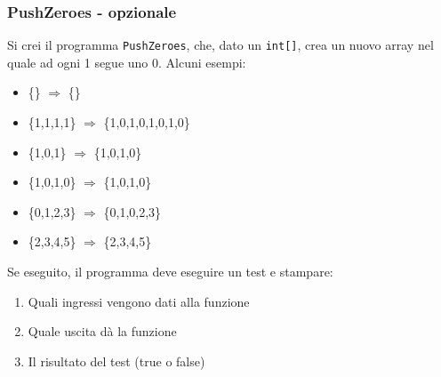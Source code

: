 \documentclass{beamer}
\begin{document}
\begin{frame}
\frametitle{PushZeroes - opzionale}
Si crei il programma \texttt{PushZeroes}, che, dato un \texttt{int[]}, crea un nuovo array nel quale ad ogni 1 segue uno 0. Alcuni esempi:
\begin{itemize}
 \item \{\} $\Rightarrow$ \{\}
 \item \{1,1,1,1\} $\Rightarrow$ \{1,0,1,0,1,0,1,0\}
 \item \{1,0,1\} $\Rightarrow$ \{1,0,1,0\}
 \item \{1,0,1,0\} $\Rightarrow$ \{1,0,1,0\}
 \item \{0,1,2,3\} $\Rightarrow$ \{0,1,0,2,3\}
 \item \{2,3,4,5\} $\Rightarrow$ \{2,3,4,5\}
\end{itemize}
Se eseguito, il programma deve eseguire un test e stampare:
\begin{enumerate}
 \item Quali ingressi vengono dati alla funzione
 \item Quale uscita dà la funzione
 \item Il risultato del test (true o false)
\end{enumerate}
\end{frame}
\end{document}

